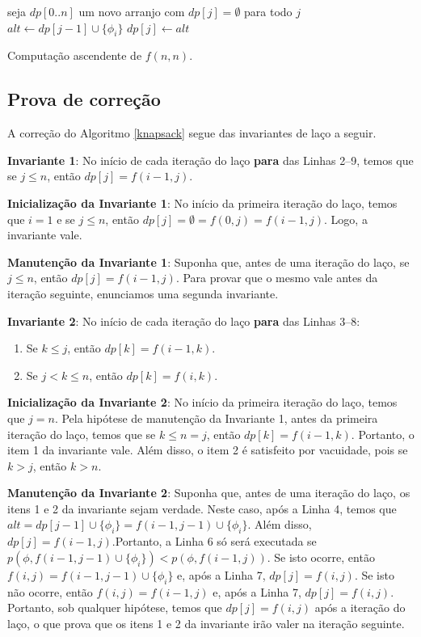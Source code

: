 \begin{algorithm}
	\begin{algorithmic}[1]
		\State seja $dp[0..n]$ um novo arranjo com $dp[j] = \emptyset$ para todo $j$
				\State $alt \gets dp[j-1] \cup \{\phi_i\}$
					\State $dp[j] \gets alt$
				\EndIf
			\EndFor
		\EndFor
	\end{algorithmic}
	\caption{Computação ascendente de $f(n,n)$.}
	\label{knapsack}
\end{algorithm}

\subsection{Prova de correção}

\indent

A correção do Algoritmo \ref{knapsack} segue das invariantes de laço a seguir.

\textbf{Invariante 1}: No início de cada iteração do laço \textbf{para} das Linhas 2--9, temos que se $j \leq n$, então $dp[j] = f(i-1,j)$.

\textbf{Inicialização da Invariante 1}: No início da primeira iteração do laço, temos que $i = 1$ e se $j \leq n$, então $dp[j] = \emptyset = f(0,j) = f(i-1,j)$. Logo, a invariante vale.

\textbf{Manutenção da Invariante 1}: Suponha que, antes de uma iteração do laço, se $j \leq n$, então $dp[j] = f(i-1,j)$. Para provar que o mesmo vale antes da iteração seguinte, enunciamos uma segunda invariante.

\textbf{Invariante 2}: No início de cada iteração do laço \textbf{para} das Linhas 3--8:
\begin{enumerate}
	\item Se $k \leq j$, então $dp[k] = f(i-1,k)$.
	\item Se $j < k \leq n$, então $dp[k] = f(i,k)$.
\end{enumerate}

\textbf{Inicialização da Invariante 2}: No início da primeira iteração do laço, temos que $j = n$. Pela hipótese de manutenção da Invariante 1, antes da primeira iteração do laço, temos que se $k \leq n = j$, então $dp[k] = f(i-1,k)$. Portanto, o item 1 da invariante vale. Além disso, o item 2 é satisfeito por vacuidade, pois se $k > j$, então $k > n$.

\textbf{Manutenção da Invariante 2}: Suponha que, antes de uma iteração do laço, os itens 1 e 2 da invariante sejam verdade. Neste caso, após a Linha 4, temos que\break $alt = dp[j-1] \cup \{\phi_i \} = f(i-1,j-1) \cup \{\phi_i \}$. Além disso, $dp[j] = f(i-1,j)$.\break Portanto, a Linha 6 só será executada se $p(\phi,f(i-1,j-1) \cup \{\phi_i \}) < p(\phi,f(i-1,j))$. Se isto ocorre, então $f(i,j) = f(i-1,j-1) \cup \{\phi_i \}$ e, após a Linha 7, $dp[j] = f(i,j)$. Se isto não ocorre, então $f(i,j) = f(i-1,j)$ e, após a Linha 7, $dp[j] = f(i,j)$. Portanto, sob qualquer hipótese, temos que $dp[j] = f(i,j)$ após a iteração do laço, o que prova que os itens 1 e 2 da invariante irão valer na iteração seguinte.

